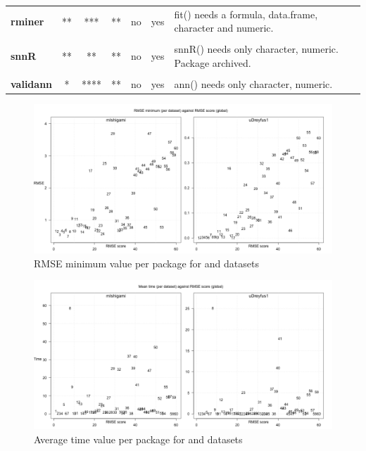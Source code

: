 \begin{Schunk}
\begin{table}
\begin{tabular}[t]{>{}lccccc>{\raggedright\arraybackslash}p{30em}}
\textbf{rminer} & ** & *** & ** & no & yes & fit() needs a formula, data.frame, character and numeric.\\
\cellcolor{gray!6}{\textbf{RSNNS}} & \cellcolor{gray!6}{**} & \cellcolor{gray!6}{***} & \cellcolor{gray!6}{**} & \cellcolor{gray!6}{no} & \cellcolor{gray!6}{yes} & \cellcolor{gray!6}{mlp() needs only character, numeric, boolean.}\\
\textbf{snnR} & ** & ** & ** & no & yes & snnR() needs only character, numeric. Package archived.\\
\cellcolor{gray!6}{\textbf{traineR}} & \cellcolor{gray!6}{*} & \cellcolor{gray!6}{**} & \cellcolor{gray!6}{**} & \cellcolor{gray!6}{yes} & \cellcolor{gray!6}{no} & \cellcolor{gray!6}{train.nnet() needs a formula, data.frame, numeric, boolean.}\\
\textbf{validann} & * & **** & ** & no & yes & ann() needs only character, numeric.\\
\bottomrule
\end{tabular}
\end{table}

\end{Schunk}

\begin{figure}
  \centering
  \includegraphics[width=\textwidth]{mIshigami-uDreyfus1-RMSEmin.png}
        \caption{RMSE minimum value per package for 
        and  datasets}
        \label{fig:Allpkg:RMSEmin}
\end{figure}

\begin{figure}
  \centering
  \includegraphics[width=\textwidth]{mIshigami-uDreyfus1-timmean.png}
        \caption{Average time value per package for 
        and  datasets}
        \label{fig:Allpkg:timemean}
\end{figure}

